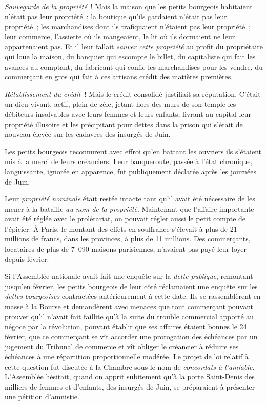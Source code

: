 \documentclass[twoside]{book} %
\begin{document}
\emph{Sauvegarde de la propriété} ! Mais la maison que les petits bourgeois habitaient n’était pas leur propriété ; la boutique qu’ils gardaient n’était pas leur propriété ; les marchandises dont ils trafiquaient n’étaient pas leur propriété ; leur commerce, l’assiette où ils mangeaient, le lit où ils dormaient ne leur appartenaient pas. Et il leur fallait \emph{sauver cette propriété} au profit du propriétaire qui loue la maison, du banquier qui escompte le billet, du capitaliste qui fait les avances au comptant, du fabricant qui confie les marchandises pour les vendre, du commerçant en gros qui fait à ces artisans crédit des matières premières.\par
\emph{Rétablissement du crédit} ! Mais le crédit consolidé justifiait sa réputation. C’était un dieu vivant, actif, plein de zèle, jetant hors des murs de son temple les débiteurs insolvables avec leurs femmes et leurs enfants, livrant au capital leur propriété illusoire et les précipitant pour dettes dans la prison qui s’était de nouveau élevée sur les cadavres des insurgés de Juin.\par
Les petits bourgeois reconnurent avec effroi qu’en battant les ouvriers ils s’étaient mis à la merci de leurs créanciers. Leur banqueroute, passée à l’état chronique, languissante, ignorée en apparence, fut publiquement déclarée après les journées de Juin.\par
Leur \emph{propriété nominale} était restée intacte tant qu’il avait été nécessaire de les mener à la bataille \emph{au nom de la propriété}. Maintenant que l’affaire importante avait été réglée avec le prolétariat, on pouvait régler aussi le petit compte de l’épicier. À Paris, le montant des effets en souffrance s’élevait à plus de 21 millions de francs, dans les provinces, à plus de 11 millions. Des commerçants, locataires de plus de 7 090 maisons parisiennes, n’avaient pas payé leur loyer depuis février.\par
Si l’Assemblée nationale avait fait une enquête sur la \emph{dette publique}, remontant jusqu’en février, les petits bourgeois de leur côté réclamaient une enquête sur les \emph{dettes bourgeoises} contractées antérieurement à cette date. Ils se rassemblèrent en masse à la Bourse et demandèrent avec menaces que tout commerçant pouvant prouver qu’il n’avait fait faillite qu’à la suite du trouble commercial apporté au négoce par la révolution, pouvant établir que ses affaires étaient bonnes le 24 février, que ce commerçant se vît accorder une prorogation des échéances par un jugement du Tribunal de commerce et vît obliger le créancier à réduire ses échéances à une répartition proportionnelle modérée. Le projet de loi relatif à cette question fut discutée à la Chambre sous le nom de \emph{concordats à l’amiable}. L’Assemblée hésitait, quand on apprit subitement qu’à la porte Saint-Denis des milliers de femmes et d’enfants, des insurgés de Juin, se préparaient à présenter une pétition d’amnistie.\par
\end{document}
